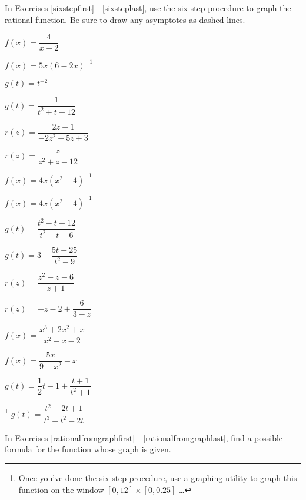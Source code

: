 \startexenum

In Exercises \ref{sixstepfirst} - \ref{sixsteplast}, use the six-step procedure to graph the rational function.  Be sure to draw any asymptotes as dashed lines.

\begin{shortexenum}[MMMMMMMMMMMMMM]
\item $f(x) = \dfrac{4}{x + 2}$ \label{sixstepfirst}
\item $f(x) = 5x(6-2x)^{-1}$  
\item $g(t) = t^{-2}$ 
\item $g(t) = \dfrac{1}{t^{2} + t - 12}$
\item $r(z) = \dfrac{2z - 1}{-2z^{2} - 5z + 3}$
\item $r(z) = \dfrac{z}{z^{2} + z - 12}$ 
\item $f(x) = 4x(x^2+4)^{-1}$
\item $f(x) = 4x(x^2-4)^{-1}$
\item $g(t) = \dfrac{t^2-t-12}{t^2+t-6}$
\item $g(t) = 3- \dfrac{5t-25}{t^2-9}$
\item $r(z) = \dfrac{z^2-z-6}{z+1}$
\item $r(z) =-z-2+\dfrac{6}{3-z}$
\item $f(x) = \dfrac{x^3+2x^2+x}{x^2-x-2}$
\item $f(x) = \dfrac{5x}{9-x^2} - x$
\item  $g(t) =\dfrac{1}{2}t-1 + \dfrac{t+1}{t^2+1}$
\item \hspace{-0.1in}\footnote{Once you've done the six-step procedure, use a graphing utility to graph this function on the window $[0, 12] \times [0, 0.25]$ \ldots} $g(t) = \dfrac{t^{2} - 2t + 1}{t^{3} + t^{2} - 2t}$ \label{sixsteplast}
\end{shortexenum}

In Exercises \ref{rationalfromgraphfirst} - \ref{rationalfromgraphlast}, find a possible formula for the function whose graph is given.

